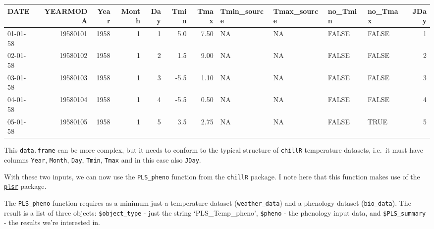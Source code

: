 \documentclass[
]{book}
\newenvironment{Shaded}{\begin{snugshade}}{\end{snugshade}}
\newcommand{\DataTypeTok}[1]{\textcolor[rgb]{0.13,0.29,0.53}{#1}}
\newcommand{\DecValTok}[1]{\textcolor[rgb]{0.00,0.00,0.81}{#1}}
\newcommand{\KeywordTok}[1]{\textcolor[rgb]{0.13,0.29,0.53}{\textbf{#1}}}
\newcommand{\NormalTok}[1]{#1}
\newcommand{\OperatorTok}[1]{\textcolor[rgb]{0.81,0.36,0.00}{\textbf{#1}}}
\newcommand{\StringTok}[1]{\textcolor[rgb]{0.31,0.60,0.02}{#1}}
\begin{document}
\begin{Shaded}
\end{Shaded}

\begingroup\fontsize{8}{10}\selectfont

\begin{tabular}{l|r|r|r|r|r|r|l|l|l|l|r}
\hline
DATE & YEARMODA & Year & Month & Day & Tmin & Tmax & Tmin\_source & Tmax\_source & no\_Tmin & no\_Tmax & JDay\\
\hline
01-01-58 & 19580101 & 1958 & 1 & 1 & 5.0 & 7.50 & NA & NA & FALSE & FALSE & 1\\
\hline
02-01-58 & 19580102 & 1958 & 1 & 2 & 1.5 & 9.00 & NA & NA & FALSE & FALSE & 2\\
\hline
03-01-58 & 19580103 & 1958 & 1 & 3 & -5.5 & 1.10 & NA & NA & FALSE & FALSE & 3\\
\hline
04-01-58 & 19580104 & 1958 & 1 & 4 & -5.5 & 0.50 & NA & NA & FALSE & FALSE & 4\\
\hline
05-01-58 & 19580105 & 1958 & 1 & 5 & 3.5 & 2.75 & NA & NA & FALSE & TRUE & 5\\
\hline
\end{tabular}
\endgroup{}

This \texttt{data.frame} can be more complex, but it needs to conform to the typical structure of \texttt{chillR} temperature datasets, i.e.~it must have columns \texttt{Year}, \texttt{Month}, \texttt{Day}, \texttt{Tmin}, \texttt{Tmax} and in this case also \texttt{JDay}.

With these two inputs, we can now use the \texttt{PLS\_pheno} function from the \texttt{chillR} package. I note here that this function makes use of the \href{https://cran.r-project.org/web/packages/pls/vignettes/pls-manual.pdf}{\texttt{plsr}} package.

The \texttt{PLS\_pheno} function requires as a minimum just a temperature dataset (\texttt{weather\_data}) and a phenology dataset (\texttt{bio\_data}). The result is a list of three objects: \texttt{\$object\_type} - just the string `PLS\_Temp\_pheno', \texttt{\$pheno} - the phenology input data, and \texttt{\$PLS\_summary} - the results we're interested in.
\end{document}

